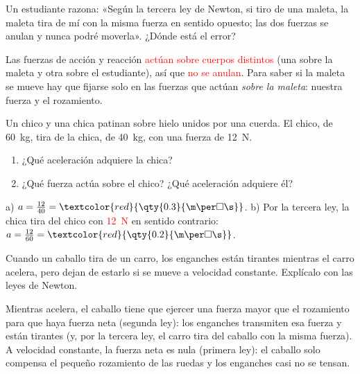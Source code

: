 \begin{exercise}
    Un estudiante razona: «Según la tercera ley de Newton, si tiro de una maleta, la maleta tira de mí con la misma fuerza en sentido opuesto; las dos fuerzas se anulan y nunca podré moverla». ¿Dónde está el error?
    \begin{solu}
        Las fuerzas de acción y reacción \textcolor{red}{actúan sobre cuerpos distintos} (una sobre la maleta y otra sobre el estudiante), así que \textcolor{red}{no se anulan}. Para saber si la maleta se mueve hay que fijarse solo en las fuerzas que actúan \emph{sobre la maleta}: nuestra fuerza y el rozamiento.
    \end{solu}
\end{exercise}

\begin{exercise}
    Un chico y una chica patinan sobre hielo unidos por una cuerda. El chico, de \qty{60}{\kg}, tira de la chica, de \qty{40}{\kg}, con una fuerza de \qty{12}{\newton}.
    \begin{enumerate}[label=\alph*)]
        \item ¿Qué aceleración adquiere la chica?
        \item ¿Qué fuerza actúa sobre el chico? ¿Qué aceleración adquiere él?
    \end{enumerate}
    \begin{solu}
        a) \(a = \frac{12}{40} = \textcolor{red}{\qty{0.3}{\m\per\square\s}}\). b) Por la tercera ley, la chica tira del chico con \textcolor{red}{\qty{12}{\newton}} en sentido contrario: \(a = \frac{12}{60} = \textcolor{red}{\qty{0.2}{\m\per\square\s}}\).
    \end{solu}
\end{exercise}

\begin{exercise}
    Cuando un caballo tira de un carro, los enganches están tirantes mientras el carro acelera, pero dejan de estarlo si se mueve a velocidad constante. Explícalo con las leyes de Newton.
    \begin{solu}
        Mientras acelera, el caballo tiene que ejercer una fuerza mayor que el rozamiento para que haya fuerza neta (segunda ley): los enganches transmiten esa fuerza y están tirantes (y, por la tercera ley, el carro tira del caballo con la misma fuerza). A velocidad constante, la fuerza neta es nula (primera ley): el caballo solo compensa el pequeño rozamiento de las ruedas y los enganches casi no se tensan.
    \end{solu}
\end{exercise}

